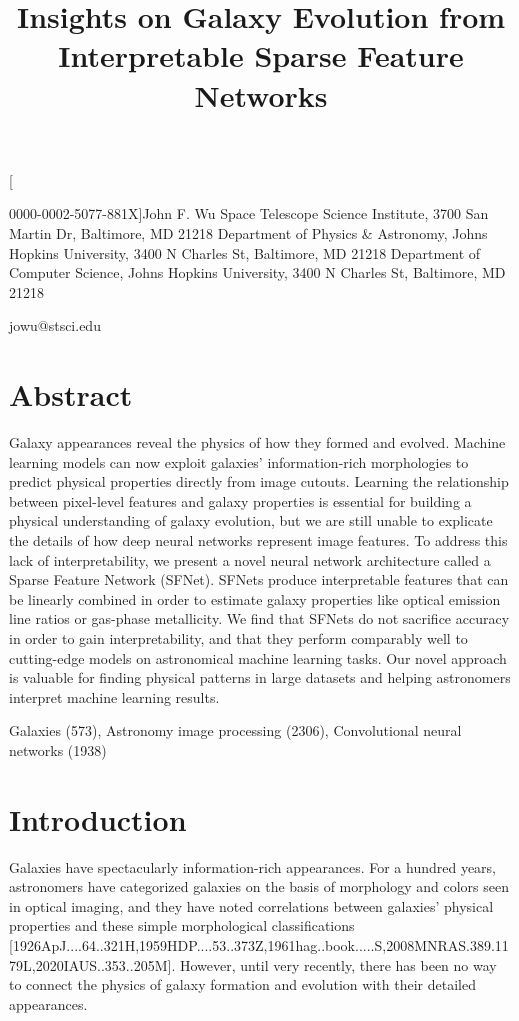 \documentclass[11pt,a4paper]{article}
\title{Insights on Galaxy Evolution from Interpretable Sparse Feature Networks}
\begin{document}
\maketitle

[

0000-0002-5077-881X]John F. Wu
Space Telescope Science Institute, 3700 San Martin Dr, Baltimore, MD 21218
Department of Physics \& Astronomy, Johns Hopkins University, 3400 N Charles St, Baltimore, MD 21218
Department of Computer Science, Johns Hopkins University, 3400 N Charles St, Baltimore, MD 21218

jowu@stsci.edu

\section{Abstract}

Galaxy appearances reveal the physics of how they formed and evolved. Machine learning models can now exploit galaxies' information-rich morphologies to predict physical properties directly from image cutouts. Learning the relationship between pixel-level features and galaxy properties is essential for building a physical understanding of galaxy evolution, but we are still unable to explicate the details of how deep neural networks represent image features. To address this lack of interpretability, we present a novel neural network architecture called a Sparse Feature Network (SFNet). SFNets produce interpretable features that can be linearly combined in order to estimate galaxy properties like optical emission line ratios or gas-phase metallicity. We find that SFNets do not sacrifice accuracy in order to gain interpretability, and that they perform comparably well to cutting-edge models on astronomical machine learning tasks. Our novel approach is valuable for finding physical patterns in large datasets and helping astronomers interpret machine learning results.

Galaxies (573), Astronomy image processing (2306), Convolutional neural networks (1938)

\section{Introduction}

Galaxies have spectacularly information-rich appearances. For a hundred years, astronomers have categorized galaxies on the basis of morphology and colors seen in optical imaging, and they have noted correlations between galaxies' physical properties and these simple morphological classifications [1926ApJ....64..321H,1959HDP....53..373Z,1961hag..book.....S,2008MNRAS.389.1179L,2020IAUS..353..205M]. However, until very recently, there has been no way to connect the physics of galaxy formation and evolution with their detailed appearances.
\end{document}
